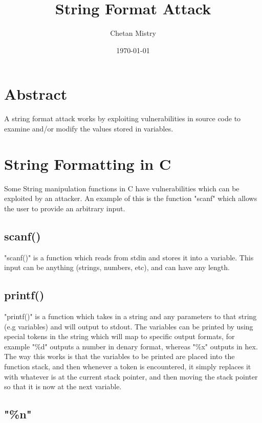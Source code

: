 \documentclass[11pt]{article}
\author{Chetan Mistry}
\date{\today}
\title{String Format Attack}
\begin{document}
\maketitle
\tableofcontents


\section{Abstract}
\label{sec:orgc210d99}

A string format attack works by exploiting vulnerabilities in source
code to examine and/or modify the values stored in variables.


\section{String Formatting in C}
\label{sec:org0f1d18c}

Some String manipulation functions in C have vulnerabilities which can
be exploited by an attacker. An example of this is the function
"scanf" which allows the user to provide an arbitrary input.

\subsection{scanf()}
\label{sec:org65356e6}

"scanf()" is a function which reads from stdin and stores it into a
variable. This input can be anything (strings, numbers, etc), and can
have any length.

\subsection{printf()}
\label{sec:org8ab0242}

"printf()" is a function which takes in a string and any parameters to
that string (e.g variables) and will output to stdout. The variables
can be printed by using special tokens in the string which will map to
specific output formats, for example "\%d" outputs a number in denary
format, whereas "\%x" outputs in hex. The way this works is that the
variables to be printed are placed into the function stack, and then
whenever a token is encountered, it simply replaces it with whatever
is at the current stack pointer, and then moving the stack pointer so
that it is now at the next variable.

\subsection{"\%n"}
\label{sec:org8ba7e0d}
\end{document}
